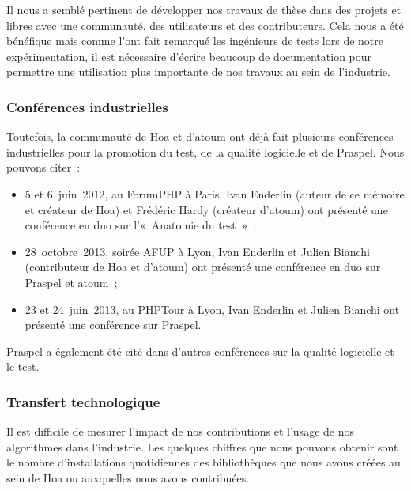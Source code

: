 Il nous a semblé pertinent de développer nos travaux de thèse dans des projets
 et libres avec une communauté, des utilisateurs et des
contributeurs. Cela nous a été bénéfique mais comme l'ont fait remarqué les
ingénieurs de tests lors de notre expérimentation, il est nécessaire d'écrire
beaucoup de documentation pour permettre une utilisation plus importante de nos
travaux au sein de l'industrie.

\subsubsection{Conférences industrielles}

Toutefois, la communauté de Hoa et d'atoum ont déjà fait plusieurs conférences
industrielles pour la promotion du test, de la qualité logicielle et de Praspel.
Nous pouvons citer~:
%
\begin{itemize}

\item 5 et 6~juin~2012, au ForumPHP à Paris, Ivan Enderlin (auteur de ce mémoire
et créateur de Hoa) et Frédéric Hardy (créateur d'atoum) ont présenté une
conférence en duo sur l'«~Anatomie du test~»~;

\item 28~octobre~2013, soirée AFUP à Lyon, Ivan Enderlin et Julien Bianchi
(contributeur de Hoa et d'atoum) ont présenté une conférence en duo sur Praspel
et atoum~;

\item 23 et 24~juin~2013, au PHPTour à Lyon, Ivan Enderlin et Julien Bianchi ont
présenté une conférence sur Praspel.

\end{itemize}
%
Praspel a également été cité dans d'autres conférences sur la qualité logicielle
et le test.

\subsubsection{Transfert technologique}

Il est difficile de mesurer l'impact de nos contributions et l'usage de nos
algorithmes dans l'industrie. Les quelques chiffres que nous pouvons obtenir
sont le nombre d'installations quotidiennes des bibliothèques que nous avons
créées au sein de Hoa ou auxquelles nous avons contribuées.


